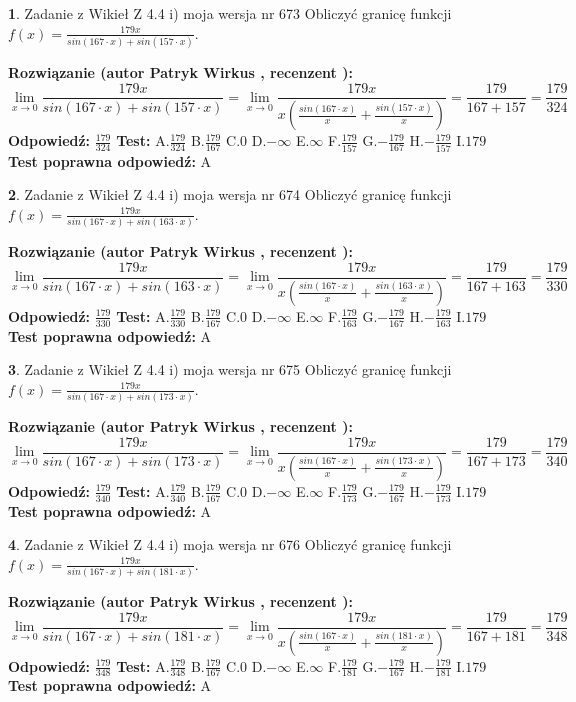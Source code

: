 \documentclass[12pt, a4paper]{article}
\theoremstyle{definition} %
\newtheorem{zad}{}
\newcommand{\zadStart}[1]{\begin{zad}#1\newline}
\newcommand{\zadStop}{\end{zad}}
\newcommand{\rozwStart}[2]{\noindent \textbf{Rozwiązanie (autor #1 , recenzent #2): }\newline}
\newcommand{\rozwStop}{\newline}
\newcommand{\odpStart}{\noindent \textbf{Odpowiedź:}\newline}
\newcommand{\odpStop}{\newline}
\newcommand{\testStart}{\noindent \textbf{Test:}\newline}
\newcommand{\testStop}{\newline}
\newcommand{\kluczStart}{\noindent \textbf{Test poprawna odpowiedź:}\newline}
\newcommand{\kluczStop}{\newline}
\begin{document}
\zadStart{Zadanie z Wikieł Z 4.4 i) moja wersja nr 673}
Obliczyć granicę funkcji $f(x)=\frac{179x}{sin(167\cdot x) +sin(157\cdot x)}$.
\zadStop
\rozwStart{Patryk Wirkus}{}
$$\lim\limits_{x\to 0}\frac{179x}{sin(167\cdot x) +sin(157\cdot x)}=\lim\limits_{x\to 0}\frac{179x}{x(\frac{sin(167\cdot x)}{x}+\frac{sin(157\cdot x)}{x})}=\frac{179}{167+157} = \frac{179}{324}$$
\rozwStop
\odpStart
$\frac{179}{324}$
\odpStop
\testStart
A.$\frac{179}{324}$
B.$\frac{179}{167}$
C.$0$
D.$-\infty$
E.$\infty$
F.$\frac{179}{157}$
G.$-\frac{179}{167}$
H.$-\frac{179}{157}$
I.$179$
\testStop
\kluczStart
A
\kluczStop



\zadStart{Zadanie z Wikieł Z 4.4 i) moja wersja nr 674}
Obliczyć granicę funkcji $f(x)=\frac{179x}{sin(167\cdot x) +sin(163\cdot x)}$.
\zadStop
\rozwStart{Patryk Wirkus}{}
$$\lim\limits_{x\to 0}\frac{179x}{sin(167\cdot x) +sin(163\cdot x)}=\lim\limits_{x\to 0}\frac{179x}{x(\frac{sin(167\cdot x)}{x}+\frac{sin(163\cdot x)}{x})}=\frac{179}{167+163} = \frac{179}{330}$$
\rozwStop
\odpStart
$\frac{179}{330}$
\odpStop
\testStart
A.$\frac{179}{330}$
B.$\frac{179}{167}$
C.$0$
D.$-\infty$
E.$\infty$
F.$\frac{179}{163}$
G.$-\frac{179}{167}$
H.$-\frac{179}{163}$
I.$179$
\testStop
\kluczStart
A
\kluczStop



\zadStart{Zadanie z Wikieł Z 4.4 i) moja wersja nr 675}
Obliczyć granicę funkcji $f(x)=\frac{179x}{sin(167\cdot x) +sin(173\cdot x)}$.
\zadStop
\rozwStart{Patryk Wirkus}{}
$$\lim\limits_{x\to 0}\frac{179x}{sin(167\cdot x) +sin(173\cdot x)}=\lim\limits_{x\to 0}\frac{179x}{x(\frac{sin(167\cdot x)}{x}+\frac{sin(173\cdot x)}{x})}=\frac{179}{167+173} = \frac{179}{340}$$
\rozwStop
\odpStart
$\frac{179}{340}$
\odpStop
\testStart
A.$\frac{179}{340}$
B.$\frac{179}{167}$
C.$0$
D.$-\infty$
E.$\infty$
F.$\frac{179}{173}$
G.$-\frac{179}{167}$
H.$-\frac{179}{173}$
I.$179$
\testStop
\kluczStart
A
\kluczStop



\zadStart{Zadanie z Wikieł Z 4.4 i) moja wersja nr 676}
Obliczyć granicę funkcji $f(x)=\frac{179x}{sin(167\cdot x) +sin(181\cdot x)}$.
\zadStop
\rozwStart{Patryk Wirkus}{}
$$\lim\limits_{x\to 0}\frac{179x}{sin(167\cdot x) +sin(181\cdot x)}=\lim\limits_{x\to 0}\frac{179x}{x(\frac{sin(167\cdot x)}{x}+\frac{sin(181\cdot x)}{x})}=\frac{179}{167+181} = \frac{179}{348}$$
\rozwStop
\odpStart
$\frac{179}{348}$
\odpStop
\testStart
A.$\frac{179}{348}$
B.$\frac{179}{167}$
C.$0$
D.$-\infty$
E.$\infty$
F.$\frac{179}{181}$
G.$-\frac{179}{167}$
H.$-\frac{179}{181}$
I.$179$
\testStop
\kluczStart
A
\kluczStop
\end{document}
